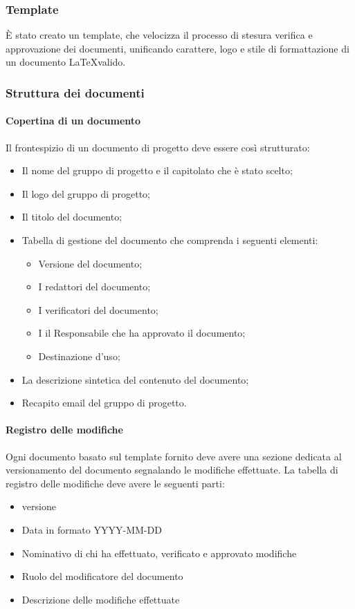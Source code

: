  \subsubsection{Template}
  \`E stato creato un template, che velocizza il processo di stesura verifica e
  approvazione dei documenti, unificando carattere, logo e stile di formattazione
  di un documento \LaTeX \space valido.

  \subsubsection{Struttura dei documenti}
  \paragraph{Copertina di un documento}
  Il frontespizio di un documento di progetto deve essere così strutturato:
  \begin{itemize}
    \item Il nome del gruppo di progetto e il capitolato che è stato scelto;
    \item Il logo del gruppo di progetto;
    \item Il titolo del documento;
    \item Tabella di gestione del documento che comprenda i seguenti elementi:
    \begin{itemize}
      \item Versione del documento;
      \item I redattori del documento;
      \item I verificatori del documento;
      \item I il Responsabile che ha approvato il documento;
      \item Destinazione d'uso;
    \end{itemize}
    \item La descrizione sintetica del contenuto del documento;
    \item Recapito email del gruppo di progetto.
  \end{itemize}
  \paragraph{Registro delle modifiche}
  Ogni documento basato sul template fornito deve avere una sezione dedicata al versionamento
  del documento segnalando le modifiche effettuate.
  La tabella di registro delle modifiche deve avere le seguenti parti:
  \begin{itemize}
    \item versione
    \item Data in formato YYYY-MM-DD
    \item Nominativo di chi ha effettuato, verificato e approvato modifiche
    \item Ruolo del modificatore del documento
    \item Descrizione delle modifiche effettuate
  \end{itemize}
